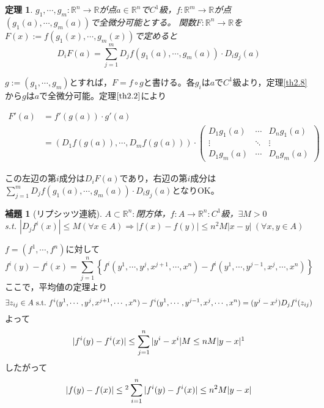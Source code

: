 \documentclass[dvipdfmx,a4j,10pt]{jsarticle}
\makeatletter
\theoremstyle{mystyle1}
\newtheorem{thm}[dfn]{定理}
\newtheorem{lem}[dfn]{補題}
\theoremstyle{mystyle2}
\renewenvironment{proof}[1][\proofname]{\par
  \pushQED{\qed}%
  \normalfont
  \topsep6\p@\@plus6\p@ \trivlist
  \item[\hskip\labelsep{\bfseries\sffamily #1}]\ignorespaces
}{%
  \popQED\endtrivlist\@endpefalse
}
\renewcommand\proofname{証明}
\makeatother
\begin{document}
\begin{framed}
	\begin{thm}\label{th2.9}
		$g_1,\cdots,g_m:\mathbb{R}^n\to\mathbb{R}$が点$a\in\mathbb{R}^n$で$C^1$級，$f:\mathbb{R}^m\to\mathbb{R}$が点$(g_1(a),\cdots,g_m(a))$で全微分可能とする。
		関数$F:\mathbb{R}^n\to\mathbb{R}$を$F(x):=f(g_1(x),\cdots,g_m(x))$で定めると
		\[
		D_iF(a)=\sum_{j=1}^mD_jf(g_1(a),\cdots,g_m(a))\cdot D_ig_j(a)
		\]
	\end{thm}
\end{framed}

\begin{proof}
	$g:=(g_1,\cdots,g_m)$とすれば，$F=f\circ g$と書ける。各$g_i$は$a$で$C^1$級より，定理\ref{th2.8}から$g$は$a$で全微分可能。定理$\ref{th2.2}$により

	\[
	\begin{split}
	F'(a)&=f'(g(a))\cdot g'(a)\\
	&=(D_1f(g(a)),\cdots,D_mf(g(a)))\cdot
	\begin{pmatrix}
		D_1g_1(a) & \cdots & D_ng_1(a)\\
		\vdots & \ddots & \vdots \\
		D_1g_m(a) & \cdots & D_ng_m(a)
	\end{pmatrix}
	\end{split}
	\]

この左辺の第$i$成分は$D_iF(a)$であり，右辺の第$i$成分は$\displaystyle\sum_{j=1}^m D_jf(g_1(a),\cdots,g_m(a))\cdot D_ig_j(a)$となりOK。
\end{proof}

\begin{framed}
	\begin{lem}[リプシッツ連続\footnotemark]\label{lem2.10}
		$A\subset\mathbb{R}^n:$閉方体，$f:A\to\mathbb{R}^n:C^1$級，$\exists M>0$\\ s.t. $|D_jf^i(x)|\leq M(\forall x\in A) \Rightarrow |f(x)-f(y)|\leq n^2 M|x-y|\ (\forall x,y\in A)$
	\end{lem}
\end{framed}
\begin{proof}
	$f=(f^1,\cdots,f^n)$に対して
	\[
	f^i(y)-f^i(x)=\sum_{j=1}^n\left\{f^i(y^1,\cdots,y^j,x^{j+1},\cdots,x^n)-f^i(y^1,\cdots,y^{j-1},x^j,\cdots,x^n)\right\}
	\]
	ここで，平均値の定理より
	\[
	\exists z_{ij}\in A\ {\rm s.t.}\ f^i(y^1,\cdots,y^j,x^{j+1},\cdots,x^n)-f^i(y^1,\cdots,y^{j-1},x^j,\cdots,x^n)=(y^j-x^j)D_jf^i(z_{ij})
	\]
	よって
	\[
	|f^i(y)-f^i(x)|\leq\sum_{j=1}^n|y^i-x^i|M\leq nM|y-x|\footnotemark
	\]
	したがって
	\[
	|f(y)-f(x)|\leq\footnotemark\sum_{i=1}^n|f^i(y)-f^i(x)|\leq n^2M|y-x|
	\]
\end{proof}
\end{document}
